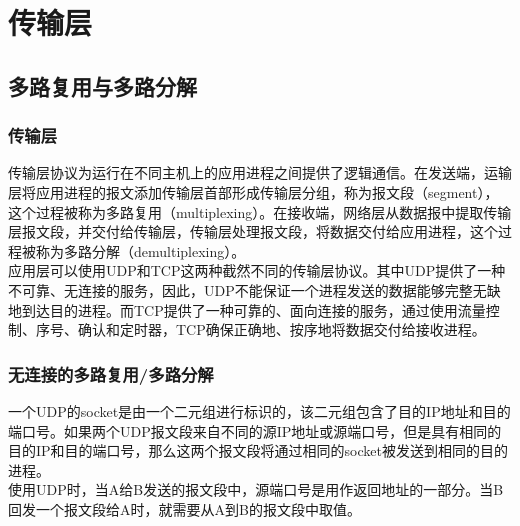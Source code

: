 \chapter{传输层}

\section{多路复用与多路分解}

\subsection{传输层}

传输层协议为运行在不同主机上的应用进程之间提供了逻辑通信。在发送端，运输层将应用进程的报文添加传输层首部形成传输层分组，称为报文段（segment），这个过程被称为多路复用（multiplexing）。在接收端，网络层从数据报中提取传输层报文段，并交付给传输层，传输层处理报文段，将数据交付给应用进程，这个过程被称为多路分解（demultiplexing）。\\

应用层可以使用UDP和TCP这两种截然不同的传输层协议。其中UDP提供了一种不可靠、无连接的服务，因此，UDP不能保证一个进程发送的数据能够完整无缺地到达目的进程。而TCP提供了一种可靠的、面向连接的服务，通过使用流量控制、序号、确认和定时器，TCP确保正确地、按序地将数据交付给接收进程。\\

\subsection{无连接的多路复用/多路分解}

一个UDP的socket是由一个二元组进行标识的，该二元组包含了目的IP地址和目的端口号。如果两个UDP报文段来自不同的源IP地址或源端口号，但是具有相同的目的IP和目的端口号，那么这两个报文段将通过相同的socket被发送到相同的目的进程。\\

使用UDP时，当A给B发送的报文段中，源端口号是用作返回地址的一部分。当B回发一个报文段给A时，就需要从A到B的报文段中取值。\\


